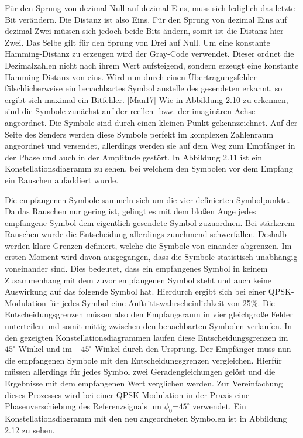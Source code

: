 Für den Sprung von dezimal Null auf dezimal Eins, muss sich lediglich das letzte Bit
verändern. Die Distanz ist also Eins. Für den Sprung von dezimal Eins auf dezimal Zwei müssen sich jedoch beide Bits ändern, somit ist die Distanz hier Zwei. Das Selbe gilt für den Sprung von Drei auf Null. Um eine konstante Hamming-Distanz zu erzeugen wird der Gray-Code verwendet. Dieser ordnet die Dezimalzahlen nicht nach ihrem Wert aufsteigend, sondern erzeugt eine konstante Hamming-Distanz von eins. Wird nun durch einen Übertragungsfehler fälschlicherweise ein benachbartes Symbol anstelle des gesendeten erkannt, so ergibt sich maximal ein Bitfehler. [Man17]
Wie in Abbildung 2.10 zu erkennen, sind die Symbole zunächst auf der reellen- bzw. der imaginären Achse angeordnet. Die Symbole sind durch einen kleinen Punkt gekennzeichnet. Auf der Seite des Senders werden diese Symbole perfekt im komplexen Zahlenraum angeordnet und versendet, allerdings werden sie auf dem Weg zum Empfänger in der Phase und auch in der Amplitude gestört. In Abbildung 2.11 ist ein Konstellationsdiagramm zu
sehen, bei welchem den Symbolen vor dem Empfang ein Rauschen aufaddiert wurde.





Die empfangenen Symbole sammeln sich um die vier definierten Symbolpunkte. Da das
Rauschen nur gering ist, gelingt es mit dem bloßen Auge jedes empfangene Symbol dem
eigentlich gesendete Symbol zuzuordnen. Bei stärkerem Rauschen wurde die Entscheidung
allerdings zunehmend schwerfallen. Deshalb werden klare Grenzen definiert, welche die
Symbole von einander abgrenzen. Im ersten Moment wird davon ausgegangen, dass die
Symbole statistisch unabhängig voneinander sind. Dies bedeutet, dass ein empfangenes
Symbol in keinem Zusammenhang mit dem zuvor empfangenen Symbol steht und auch
keine Auswirkung auf das folgende Symbol hat. Hierdurch ergibt sich bei einer QPSK-Modulation für jedes Symbol eine Auftrittswahrscheinlichkeit von 25\%. Die Entscheidungsgrenzen müssen also den Empfangsraum in vier gleichgroße Felder unterteilen und somit mittig zwischen den benachbarten Symbolen verlaufen. In den gezeigten Konstellationsdiagrammen laufen diese Entscheidungsgrenzen im $45^\circ$-Winkel und im $-45^\circ$ Winkel durch den Ursprung. Der Empfänger muss nun die empfangenen Symbole mit den Entscheidungsgrenzen vergleichen. Hierfür müssen allerdings für jedes Symbol zwei Geradengleichungen gelöst und die Ergebnisse mit dem empfangenen Wert verglichen werden.
Zur Vereinfachung dieses Prozesses wird bei einer QPSK-Modulation in der Praxis eine Phasenverschiebung des Referenzsignals um $\phi_0$=$45^\circ$ verwendet. Ein Konstellationsdiagramm mit den neu angeordneten Symbolen ist in Abbildung 2.12 zu sehen.

